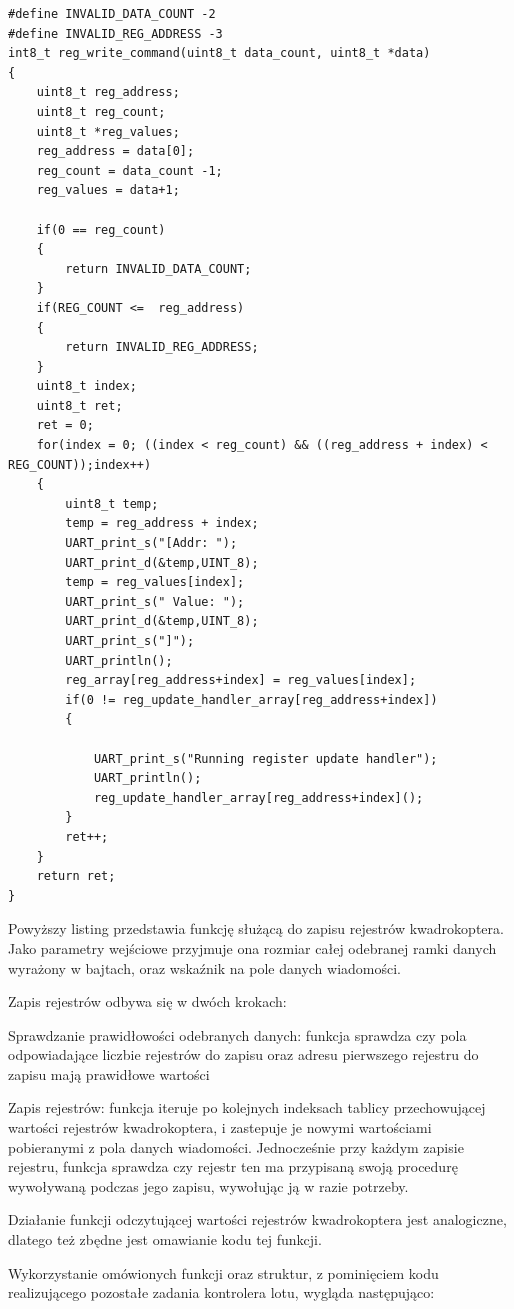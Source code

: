 \begin{lstlisting}
#define INVALID_DATA_COUNT -2
#define INVALID_REG_ADDRESS -3
int8_t reg_write_command(uint8_t data_count, uint8_t *data)
{
	uint8_t reg_address;
	uint8_t reg_count;
	uint8_t *reg_values;
	reg_address = data[0];
	reg_count = data_count -1;
	reg_values = data+1;

	if(0 == reg_count)
	{
		return INVALID_DATA_COUNT;
	}
	if(REG_COUNT <=  reg_address)
	{
		return INVALID_REG_ADDRESS;
	}
	uint8_t index;
	uint8_t ret;
	ret = 0;
	for(index = 0; ((index < reg_count) && ((reg_address + index) < REG_COUNT));index++)
	{
		uint8_t temp;
		temp = reg_address + index;
		UART_print_s("[Addr: ");
		UART_print_d(&temp,UINT_8);
		temp = reg_values[index];
		UART_print_s(" Value: ");
		UART_print_d(&temp,UINT_8);
		UART_print_s("]");
		UART_println();
		reg_array[reg_address+index] = reg_values[index];
		if(0 != reg_update_handler_array[reg_address+index])
		{

			UART_print_s("Running register update handler");
			UART_println();
			reg_update_handler_array[reg_address+index]();
		}
		ret++;
	} 
	return ret;
}
\end{lstlisting}

Powyższy listing przedstawia funkcję służącą do zapisu rejestrów kwadrokoptera. Jako parametry wejściowe przyjmuje ona rozmiar całej odebranej ramki danych wyrażony w bajtach, oraz wskaźnik na pole danych wiadomości.

Zapis rejestrów odbywa się w dwóch krokach:

Sprawdzanie prawidłowości odebranych danych: funkcja sprawdza czy pola odpowiadające liczbie rejestrów do zapisu oraz adresu pierwszego rejestru do zapisu mają prawidłowe wartości 

Zapis rejestrów: funkcja iteruje po kolejnych indeksach tablicy przechowującej wartości rejestrów kwadrokoptera, i zastepuje je nowymi wartościami pobieranymi z pola danych wiadomości. Jednocześnie przy każdym zapisie rejestru, funkcja sprawdza czy rejestr ten ma przypisaną swoją procedurę wywoływaną podczas jego zapisu, wywołując ją w razie potrzeby.

Działanie funkcji odczytującej wartości rejestrów kwadrokoptera jest analogiczne, dlatego też zbędne jest omawianie kodu tej funkcji.

Wykorzystanie omówionych funkcji oraz struktur, z pominięciem kodu realizującego pozostałe zadania kontrolera lotu, wygląda następująco:

